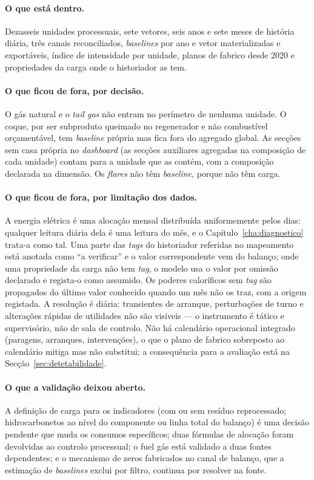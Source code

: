 \paragraph{O que está dentro.} Dezasseis unidades processuais, sete
vetores, seis anos e sete meses de história diária, três canais
reconciliados, \emph{baselines} por ano e vetor materializadas e
exportáveis, índice de intensidade por unidade, planos de fabrico desde
2020 e propriedades da carga onde o historiador as tem.

\paragraph{O que ficou de fora, por decisão.} O gás natural e o
\emph{tail gas} não entram no perímetro de nenhuma unidade. O coque, por
ser subproduto queimado no regenerador e não combustível orçamentável,
tem \emph{baseline} própria mas fica fora do agregado global. As secções
sem casa própria no \emph{dashboard} (as secções auxiliares agregadas na
composição de cada unidade) contam para a unidade que as contém, com a
composição declarada na dimensão. Os \emph{flares} não têm
\emph{baseline}, porque não têm carga.

\paragraph{O que ficou de fora, por limitação dos dados.} A energia
elétrica é uma alocação mensal distribuída uniformemente pelos dias:
qualquer leitura diária dela é uma leitura do mês, e o
Capítulo~\ref{cha:diagnostico} trata-a como tal. Uma parte das
\emph{tags} do historiador referidas no mapeamento está anotada como ``a
verificar'' e o valor correspondente vem do balanço; onde uma
propriedade da carga não tem \emph{tag}, o modelo usa o valor por omissão
declarado e regista-o como assumido. Os poderes caloríficos sem
\emph{tag} são propagados do último valor conhecido quando um mês não os
traz, com a origem registada. A resolução é diária: transientes de
arranque, perturbações de turno e alterações rápidas de utilidades não
são visíveis --- o instrumento é tático e supervisório, não de sala de
controlo. Não há calendário operacional integrado (paragens, arranques,
intervenções), o que o plano de fabrico sobreposto ao calendário mitiga
mas não substitui; a consequência para a avaliação está na
Secção~\ref{sec:detetabilidade}.

\paragraph{O que a validação deixou aberto.} A definição de carga para os
indicadores (com ou sem resíduo reprocessado; hidrocarbonetos ao nível do
componente ou linha total do balanço) é uma decisão pendente que muda os
consumos específicos; duas fórmulas de alocação foram devolvidas ao
controlo processual; o fuel gás está validado a duas fontes dependentes; e
o mecanismo de zeros fabricados no canal de balanço, que a estimação de
\emph{baselines} exclui por filtro, continua por resolver na fonte.

